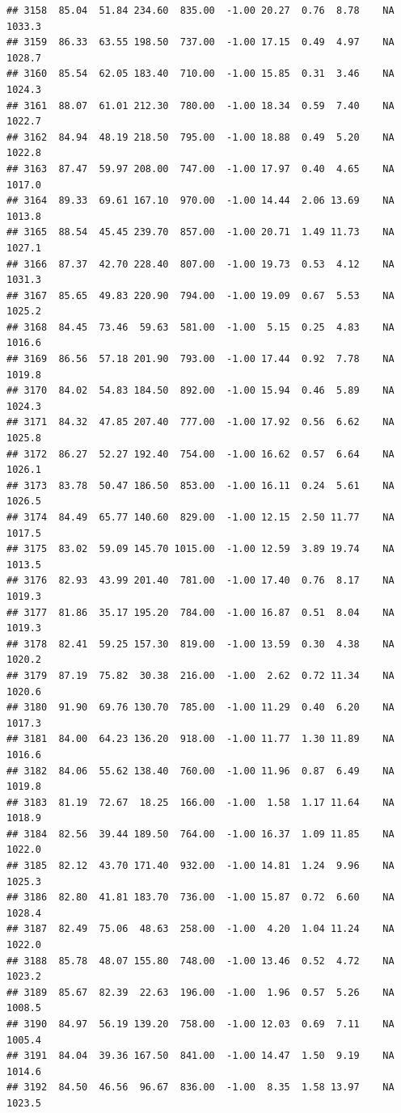 \documentclass{article}\usepackage{graphicx, color}
\makeatletter
\newenvironment{kframe}{%
 \def\at@end@of@kframe{}%
 \ifinner\ifhmode%
  \def\at@end@of@kframe{\end{minipage}}%
  \begin{minipage}{\columnwidth}%
 \fi\fi%
 \def\FrameCommand##1{\hskip\@totalleftmargin \hskip-\fboxsep
 \colorbox{shadecolor}{##1}\hskip-\fboxsep
     \hskip-\linewidth \hskip-\@totalleftmargin \hskip\columnwidth}%
 \MakeFramed {\advance\hsize-\width
   \@totalleftmargin\z@ \linewidth\hsize
   \@setminipage}}%
 {\par\unskip\endMakeFramed%
 \at@end@of@kframe}
\newenvironment{knitrout}{}{} %
\makeatother
\begin{document}
\begin{knitrout}
\begin{kframe}
\begin{verbatim}
## 3158  85.04  51.84 234.60  835.00  -1.00 20.27  0.76  8.78    NA 1033.3
## 3159  86.33  63.55 198.50  737.00  -1.00 17.15  0.49  4.97    NA 1028.7
## 3160  85.54  62.05 183.40  710.00  -1.00 15.85  0.31  3.46    NA 1024.3
## 3161  88.07  61.01 212.30  780.00  -1.00 18.34  0.59  7.40    NA 1022.7
## 3162  84.94  48.19 218.50  795.00  -1.00 18.88  0.49  5.20    NA 1022.8
## 3163  87.47  59.97 208.00  747.00  -1.00 17.97  0.40  4.65    NA 1017.0
## 3164  89.33  69.61 167.10  970.00  -1.00 14.44  2.06 13.69    NA 1013.8
## 3165  88.54  45.45 239.70  857.00  -1.00 20.71  1.49 11.73    NA 1027.1
## 3166  87.37  42.70 228.40  807.00  -1.00 19.73  0.53  4.12    NA 1031.3
## 3167  85.65  49.83 220.90  794.00  -1.00 19.09  0.67  5.53    NA 1025.2
## 3168  84.45  73.46  59.63  581.00  -1.00  5.15  0.25  4.83    NA 1016.6
## 3169  86.56  57.18 201.90  793.00  -1.00 17.44  0.92  7.78    NA 1019.8
## 3170  84.02  54.83 184.50  892.00  -1.00 15.94  0.46  5.89    NA 1024.3
## 3171  84.32  47.85 207.40  777.00  -1.00 17.92  0.56  6.62    NA 1025.8
## 3172  86.27  52.27 192.40  754.00  -1.00 16.62  0.57  6.64    NA 1026.1
## 3173  83.78  50.47 186.50  853.00  -1.00 16.11  0.24  5.61    NA 1026.5
## 3174  84.49  65.77 140.60  829.00  -1.00 12.15  2.50 11.77    NA 1017.5
## 3175  83.02  59.09 145.70 1015.00  -1.00 12.59  3.89 19.74    NA 1013.5
## 3176  82.93  43.99 201.40  781.00  -1.00 17.40  0.76  8.17    NA 1019.3
## 3177  81.86  35.17 195.20  784.00  -1.00 16.87  0.51  8.04    NA 1019.3
## 3178  82.41  59.25 157.30  819.00  -1.00 13.59  0.30  4.38    NA 1020.2
## 3179  87.19  75.82  30.38  216.00  -1.00  2.62  0.72 11.34    NA 1020.6
## 3180  91.90  69.76 130.70  785.00  -1.00 11.29  0.40  6.20    NA 1017.3
## 3181  84.00  64.23 136.20  918.00  -1.00 11.77  1.30 11.89    NA 1016.6
## 3182  84.06  55.62 138.40  760.00  -1.00 11.96  0.87  6.49    NA 1019.8
## 3183  81.19  72.67  18.25  166.00  -1.00  1.58  1.17 11.64    NA 1018.9
## 3184  82.56  39.44 189.50  764.00  -1.00 16.37  1.09 11.85    NA 1022.0
## 3185  82.12  43.70 171.40  932.00  -1.00 14.81  1.24  9.96    NA 1025.3
## 3186  82.80  41.81 183.70  736.00  -1.00 15.87  0.72  6.60    NA 1028.4
## 3187  82.49  75.06  48.63  258.00  -1.00  4.20  1.04 11.24    NA 1022.0
## 3188  85.78  48.07 155.80  748.00  -1.00 13.46  0.52  4.72    NA 1023.2
## 3189  85.67  82.39  22.63  196.00  -1.00  1.96  0.57  5.26    NA 1008.5
## 3190  84.97  56.19 139.20  758.00  -1.00 12.03  0.69  7.11    NA 1005.4
## 3191  84.04  39.36 167.50  841.00  -1.00 14.47  1.50  9.19    NA 1014.6
## 3192  84.50  46.56  96.67  836.00  -1.00  8.35  1.58 13.97    NA 1023.5

\end{verbatim}
\end{kframe}
\end{knitrout}
\end{document}
